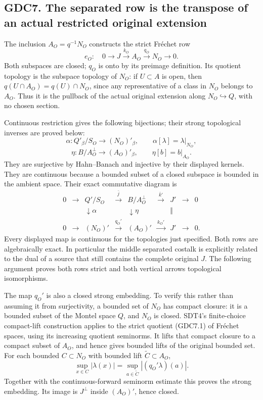 \subsection{GDC7. The separated row is the transpose of an actual
restricted original
extension}\label{gdc7.-the-separated-row-is-the-transpose-of-an-actual-restricted-original-extension}

The inclusion \(A_O=q^{-1}N_O\) constructs the strict Fréchet row \[
e_O:\quad0\to J\xrightarrow{k_O}A_O\xrightarrow{q_O}N_O\to0.
\tag{GDC7.1}
\] Both subspaces are closed; \(q_O\) is onto by its preimage
definition. Its quotient topology is the subspace topology of \(N_O\):
if \(U\subset A\) is open, then \(q(U\cap A_O)=q(U)\cap N_O\), since any
representative of a class in \(N_O\) belongs to \(A_O\). Thus it is the
pullback of the actual original extension along
\(N_O\hookrightarrow Q\), with no chosen section.

Continuous restriction gives the following bijections; their strong
topological inverses are proved below: \[
\alpha:Q'_\beta/S_O\longrightarrow (N_O)'_\beta,
\qquad \alpha[\lambda]=\lambda|_{N_O},
\] \[
\eta:B/A_O^\perp\longrightarrow (A_O)'_\beta,
\qquad\eta[b]=b|_{A_O}.
\tag{GDC7.2}
\] They are surjective by Hahn--Banach and injective by their displayed
kernels. They are continuous because a bounded subset of a closed
subspace is bounded in the ambient space. Their exact commutative
diagram is \[
\begin{array}{ccccccccc}
0&\to&Q'/S_O&\xrightarrow{\bar j}&B/A_O^\perp&\xrightarrow{\bar k'}&J'&\to&0\\
&&\downarrow\alpha&&\downarrow\eta&&\Vert\\
0&\to&(N_O)'&\xrightarrow{q_O'}&(A_O)'&\xrightarrow{k_O'}&J'&\to&0.
\end{array}
\tag{GDC7.3}
\] Every displayed map is continuous for the topologies just specified.
Both rows are algebraically exact. In particular the middle separated
costalk is explicitly related to the dual of a source that still
contains the complete original \(J\). The following argument proves both
rows strict and both vertical arrows topological isomorphisms.

The map \(q_O'\) is also a closed strong embedding. To verify this
rather than assuming it from surjectivity, a bounded set of \(N_O\) has
compact closure: it is a bounded subset of the Montel space \(Q\), and
\(N_O\) is closed. SDT4's finite-choice compact-lift construction
applies to the strict quotient (GDC7.1) of Fréchet spaces, using its
increasing quotient seminorms. It lifts that compact closure to a
compact subset of \(A_O\), and hence gives bounded lifts of the original
bounded set. For each bounded \(C\subset N_O\) with bounded lift
\(\widetilde C\subset A_O\), \[
\sup_{x\in C}|\lambda(x)|
=\sup_{a\in\widetilde C}|(q_O'\lambda)(a)|.
\tag{GDC7.4}
\] Together with the continuous-forward seminorm estimate this proves
the strong embedding. Its image is \(J^\perp\) inside \((A_O)'\), hence
closed.

